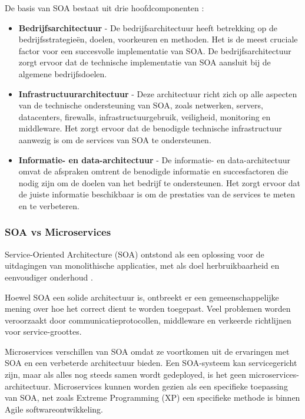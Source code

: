 De basis van SOA bestaat uit drie hoofdcomponenten \autocite{Muhardany2020}:

\begin{itemize}
	\item \textbf{Bedrijfsarchitectuur} - De bedrijfsarchitectuur heeft betrekking op de bedrijfsstrategieën, doelen, voorkeuren en methoden. Het is de meest cruciale factor voor een succesvolle implementatie van SOA. De bedrijfsarchitectuur zorgt ervoor dat de technische implementatie van SOA aansluit bij de algemene bedrijfsdoelen.
	\item \textbf{Infrastructuurarchitectuur} - Deze architectuur richt zich op alle aspecten van de technische ondersteuning van SOA, zoals netwerken, servers, datacenters, firewalls, infrastructuurgebruik, veiligheid, monitoring en middleware. Het zorgt ervoor dat de benodigde technische infrastructuur aanwezig is om de services van SOA te ondersteunen.
	\item \textbf{Informatie- en data-architectuur} - De informatie- en data-architectuur omvat de afspraken omtrent de benodigde informatie en succesfactoren die nodig zijn om de doelen van het bedrijf te ondersteunen. Het zorgt ervoor dat de juiste informatie beschikbaar is om de prestaties van de services te meten en te verbeteren.
\end{itemize}

\subsubsection{SOA vs Microservices}

Service-Oriented Architecture (SOA) ontstond als een oplossing voor de uitdagingen van monolithische applicaties, met als doel herbruikbaarheid en eenvoudiger onderhoud \autocite{Newman2021}.

Hoewel SOA een solide architectuur is, ontbreekt er een gemeenschappelijke mening over hoe het correct dient te worden toegepast. Veel problemen worden veroorzaakt door communicatieprotocollen, middleware en verkeerde richtlijnen voor service-groottes.

Microservices verschillen van SOA omdat ze voortkomen uit de ervaringen met SOA en een verbeterde architectuur bieden. Een SOA-systeem kan servicegericht zijn, maar als alles nog steeds samen wordt gedeployed, is het geen microservices-architectuur. Microservices kunnen worden gezien als een specifieke toepassing van SOA, net zoals Extreme Programming (XP) een specifieke methode is binnen Agile softwareontwikkeling.

